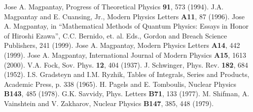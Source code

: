 \documentclass[a4paper,12pt]{article}
\begin{document}
\begin{thebibliography}{99}
 Jose A. Magpantay, {Progress of Theoretical Physics} \textbf{91}, 573 (1994).
 J.A. Magpantay and E. Cuansing, Jr., {Modern Physics Letters} \textbf{A11}, 87 (1996).
 Jose A. Magpantay, in ``Mathematical Methods of Quantum Physics:  Essays in Honor of Hiroshi Ezawa'', C.C. Bernido, et. al. Eds., Gordon and Breach Science Publishers, 241 (1999).
	Jose A. Magpantay, {Modern Physics Letters} \textbf{A14}, 442 (1999).
	Jose A. Magpantay, {International Journal of Modern Physics} \textbf{A15}, 1613 (2000).
	V.A. Fock, {Sov. Phys.} \textbf{12}, 404 (1937).
 J. Schwinger, {Phys. Rev.} \textbf{182}, 684 (1952).
 I.S. Gradsteyn and I.M. Ryzhik, Tables of Integrals, Series and Products, Academic Press, p. 338 (1965).
 H. Pagels and E. Tomboulis, {Nuclear Physics} \textbf{B143}, 485 (1978).
 G.K. Savvidy, {Phys. Letters} \textbf{B71}, 133 (1977).
 M. Shifman, A. Vainshtein and V. Zakharov, {Nuclear Physics} \textbf{B147}, 385, 448 (1979).
\end{thebibliography}
\end{document}
